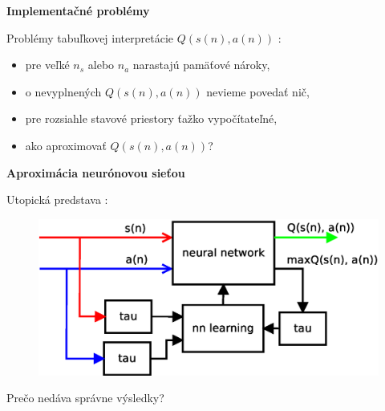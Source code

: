 \documentclass[xcolor=dvipsnames]{beamer}
\begin{document}
\begin{frame}{\bf Implementačné problémy}

Problémy tabuľkovej interpretácie $Q(s(n), a(n))$ :

\begin{itemize}
\item pre veľké ${n_s}$  alebo  ${n_a}$ narastajú pamäťové nároky,
\item o nevyplnených $Q(s(n), a(n))$ nevieme povedať nič,
\item pre rozsiahle stavové priestory ťažko vypočítateľné,
\item ako aproximovať $Q(s(n), a(n))$?
\end{itemize}

\end{frame}


\begin{frame}{\bf Aproximácia neurónovou sieťou}

Utopická predstava :

\begin{figure}[!htb]
\includegraphics[scale=.5]{../diagrams/q_learning_nn.eps}
\end{figure}

Prečo nedáva správne výsledky?
\end{frame}
\end{document}
